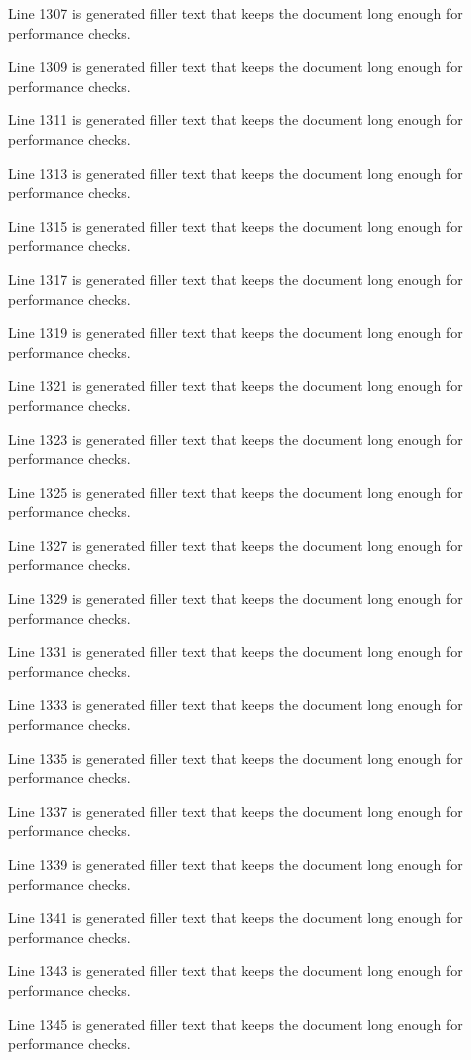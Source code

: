 Line 1307 is generated filler text that keeps the document long enough for performance checks.

Line 1309 is generated filler text that keeps the document long enough for performance checks.

Line 1311 is generated filler text that keeps the document long enough for performance checks.

Line 1313 is generated filler text that keeps the document long enough for performance checks.

Line 1315 is generated filler text that keeps the document long enough for performance checks.

Line 1317 is generated filler text that keeps the document long enough for performance checks.

Line 1319 is generated filler text that keeps the document long enough for performance checks.

Line 1321 is generated filler text that keeps the document long enough for performance checks.

Line 1323 is generated filler text that keeps the document long enough for performance checks.

Line 1325 is generated filler text that keeps the document long enough for performance checks.

Line 1327 is generated filler text that keeps the document long enough for performance checks.

Line 1329 is generated filler text that keeps the document long enough for performance checks.

Line 1331 is generated filler text that keeps the document long enough for performance checks.

Line 1333 is generated filler text that keeps the document long enough for performance checks.

Line 1335 is generated filler text that keeps the document long enough for performance checks.

Line 1337 is generated filler text that keeps the document long enough for performance checks.

Line 1339 is generated filler text that keeps the document long enough for performance checks.

Line 1341 is generated filler text that keeps the document long enough for performance checks.

Line 1343 is generated filler text that keeps the document long enough for performance checks.

Line 1345 is generated filler text that keeps the document long enough for performance checks.

